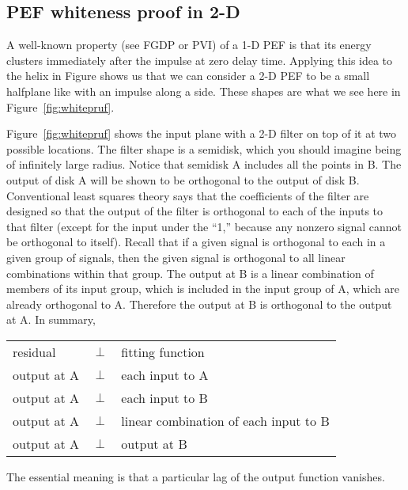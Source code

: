 \subsection{PEF whiteness proof in 2-D}
\par
{}
A well-known property (see FGDP or PVI)
of a 1-D PEF is that its energy clusters immediately after the
impulse at zero delay time.
Applying this idea to
the helix in Figure %
shows us that we can consider a 2-D PEF
to be a small halfplane like
with an impulse along a side.
These shapes are what we see here in
Figure~\ref{fig:whitepruf}.


\par
Figure~\ref{fig:whitepruf} shows the input plane with a 2-D filter on top
of it at two possible locations.
The filter shape is a semidisk,
which you should imagine being of
infinitely large radius.
Notice that semidisk A includes all the points in B.
The output of disk A will be shown to be orthogonal to the output
of disk B.
Conventional least squares theory says that the coefficients of the filter
are designed so that the output of the filter
is orthogonal to each of the inputs to that filter
(except for the input under the ``1,''
because any nonzero signal cannot be orthogonal to itself).
Recall that if a given signal is orthogonal to each in a given group of signals,
then the given signal is orthogonal
to all linear combinations within that group.
The output at B is a linear combination of members
of its input group,
which is included in the input group of A,
which are already orthogonal to A.
Therefore the output at B is orthogonal to the output at A.
In summary,
\par            %
\begin{tabular}{lll}
residual     & $\perp$ &  fitting function \\
output at A  & $\perp$ &  each input to A \\
output at A  & $\perp$ &  each input to B \\
output at A  & $\perp$ &  linear combination of each input to B \\
output at A  & $\perp$ &  output at B
\end{tabular}
\par            %
\noindent
The essential meaning is that
a particular lag of the output  function vanishes.

